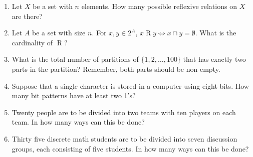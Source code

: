\documentclass{article}
\theoremstyle{definition}
\begin{document}
\begin{question}{18}
    \begin{enumerate}
    	\item Let $X$ be a set with $n$ elements. How many possible reflexive relations on $X$ are there?
	\item Let $A$ be a set with size $n$. For $x, y \in 2^{A}$, $x\mathrel{R}y \iff x \cap y = \emptyset$. What is the cardinality of $\mathrel{R}$?
   	\item What is the total number of partitions of $\{1, 2, \dots, 100 \}$ that has exactly two parts in the partition? 
	Remember, both parts should be non-empty.
        \item Suppose that a single character is stored in a computer using eight bits. 
        How many bit patterns have at least two 1's?
        	\item Twenty people are to be divided into two teams with ten players on each team.  
	In how many ways can this be done?
        \item Thirty five discrete math students are to be divided into seven discussion groups, each consisting of five students.  
        In how many ways can this be done?
   	\end{enumerate}
\end{question}
\end{document}
